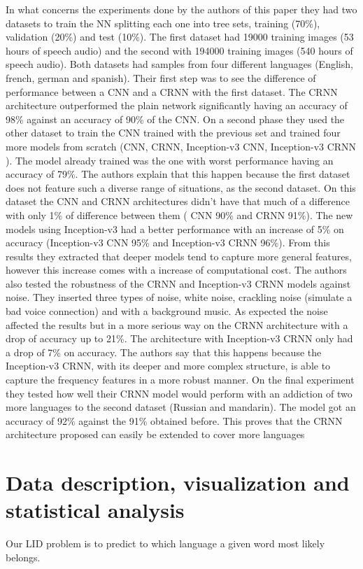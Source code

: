 \documentclass[journal, a4paper]{IEEEtran}
\begin{document}
\begin{itemize}
      In what concerns the experiments done by the authors of this paper they had two datasets to train
the NN splitting each one into tree sets, training (70\%), validation (20\%) and test (10\%). The first
dataset had 19000 training images (53 hours of speech audio) and the second with 194000 training images
(540 hours of speech audio). Both datasets had samples from four different languages (English, french,
german and spanish). Their first step was to see the difference of performance between a CNN
and a CRNN with the first dataset. The CRNN architecture outperformed the plain network significantly having
an accuracy of 98\% against an accuracy of 90\% of the CNN. On a second phase they used the other dataset
to train the CNN trained with the previous set and trained four more models from scratch (CNN, CRNN, 
Inception-v3 CNN, Inception-v3 CRNN \cite{inceptionv3}). The model already trained was the one with
worst performance having an accuracy of 79\%. The authors explain that this happen because the first dataset
does not feature such a diverse range of situations, as the second dataset. On this dataset the CNN and
CRNN architectures didn't have that much of a difference with only 1\% of difference between them (
CNN 90\% and CRNN 91\%). The new models using Inception-v3 had a better performance with an increase of
5\% on accuracy (Inception-v3 CNN 95\% and Inception-v3 CRNN 96\%). From this results they extracted that
deeper models tend to capture more general features, however this increase comes with a increase of
computational cost. The authors also tested the robustness of the CRNN and Inception-v3 CRNN models
against noise. They inserted three types of noise, white noise, crackling noise (simulate a bad voice
connection) and with a background music. As expected the noise affected the results but in a more
serious way on the CRNN architecture with a drop of accuracy up to 21\%. The architecture with
Inception-v3 CRNN only had a drop of 7\% on accuracy. The authors say that this happens because
the Inception-v3 CRNN, with its deeper and more complex structure, is able to capture the frequency
features in a more robust manner. On the final experiment they tested how well their CRNN model
would perform with an addiction of two more languages to the second dataset (Russian and mandarin).
The model got an accuracy of 92\% against the 91\% obtained before. This proves that the CRNN architecture
proposed can easily be extended to cover more languages
  \end{itemize}

\section{Data description, visualization and statistical analysis}
    Our LID problem is to predict to which language a given word most likely belongs.
\end{document}
